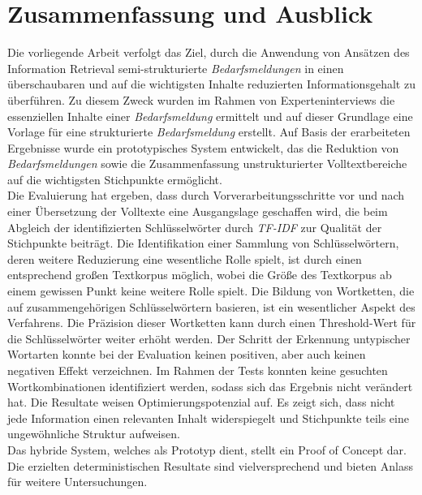 \chapter{Zusammenfassung und Ausblick}
\label{chap:ergebnisseausblick}
Die vorliegende Arbeit verfolgt das Ziel, durch die Anwendung von Ansätzen des Information Retrieval semi-strukturierte \emph{Bedarfsmeldungen} in einen überschaubaren und auf die wichtigsten Inhalte reduzierten Informationsgehalt zu überführen. Zu diesem Zweck wurden im Rahmen von Experteninterviews die essenziellen Inhalte einer \emph{Bedarfsmeldung} ermittelt und auf dieser Grundlage eine Vorlage für eine strukturierte \emph{Bedarfsmeldung} erstellt. Auf Basis der erarbeiteten Ergebnisse wurde ein prototypisches System entwickelt, das die Reduktion von \emph{Bedarfsmeldungen} sowie die Zusammenfassung unstrukturierter Volltextbereiche auf die wichtigsten Stichpunkte ermöglicht.\\

Die Evaluierung hat ergeben, dass durch Vorverarbeitungsschritte vor und nach einer Übersetzung der Volltexte eine Ausgangslage geschaffen wird, die beim Abgleich der identifizierten Schlüsselwörter durch \emph{TF-IDF} zur Qualität der Stichpunkte beiträgt. Die Identifikation einer Sammlung von Schlüsselwörtern, deren weitere Reduzierung eine wesentliche Rolle spielt, ist durch einen entsprechend großen Textkorpus möglich, wobei die Größe des Textkorpus ab einem gewissen Punkt keine weitere Rolle spielt. Die Bildung von Wortketten, die auf zusammengehörigen Schlüsselwörtern basieren, ist ein wesentlicher Aspekt des Verfahrens. Die Präzision dieser Wortketten kann durch einen Threshold-Wert für die Schlüsselwörter weiter erhöht werden. Der Schritt der Erkennung untypischer Wortarten konnte bei der Evaluation keinen positiven, aber auch keinen negativen Effekt verzeichnen. Im Rahmen der Tests konnten keine gesuchten Wortkombinationen identifiziert werden, sodass sich das Ergebnis nicht verändert hat. Die Resultate weisen Optimierungspotenzial auf. Es zeigt sich, dass nicht jede Information einen relevanten Inhalt widerspiegelt und Stichpunkte teils eine ungewöhnliche Struktur aufweisen. \\

Das hybride System, welches als Prototyp dient, stellt ein Proof of Concept dar. Die erzielten deterministischen Resultate sind vielversprechend und bieten Anlass für weitere Untersuchungen.



